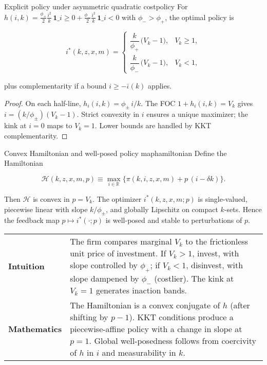 \documentclass[11pt,letterpaper,oneside]{article}
\numberwithin{equation}{section}
\newcommand{\R}{\mathbb{R}}
\newcommand{\1}{\mathbf{1}}
\newcommand{\ind}[1]{\mathbf{1}\_{{#1}}}
\newcommand{\kbar}{\bar\iota}
\begin{document}
\begin{proposition}{Explicit policy under asymmetric quadratic cost}{policy}
For
$h(i,k)=\tfrac{\phi_+}{2}\tfrac{i^2}{k}\,\ind{i\ge 0}
+\tfrac{\phi_-}{2}\tfrac{i^2}{k}\,\ind{i<0}$
with $\phi_->\phi_+$, the optimal policy is

$$
i^*(k,z,x,m)=
\begin{cases}
\dfrac{k}{\phi_+}\,\big(V_k-1\big), & V_k\ge 1,\\[6pt]
\dfrac{k}{\phi_-}\,\big(V_k-1\big), & V_k< 1,
\end{cases}
$$

plus complementarity if a bound $i\ge -\kbar(k)$ applies.
\end{proposition}

\begin{proof}
On each half-line, $h_i(i,k)=\phi_\pm\,i/k$. The FOC $1+h_i(i,k)=V_k$ gives $i=(k/\phi_\pm)(V_k-1)$. Strict convexity in $i$ ensures a unique maximizer; the kink at $i=0$ maps to $V_k=1$. Lower bounds are handled by KKT complementarity.
\end{proof}

\begin{proposition}{Convex Hamiltonian and well-posed policy map}{hamiltonian}
Define the Hamiltonian

$$
\mathcal{H}(k,z,x,m,p)\equiv \max_{i\in\R}\{\pi(k,i,z,x,m)+p\,(i-\delta k)\}.
$$

Then $\mathcal{H}$ is convex in $p=V_k$. The optimizer $i^*(k,z,x,m;p)$ is single-valued, piecewise linear with slope $k/\phi_\pm$, and globally Lipschitz on compact $k$-sets. Hence the feedback map $p\mapsto i^*(\cdot;p)$ is well-posed and stable to perturbations of $p$.
\end{proposition}

\begin{tcolorbox}[didacticstyle]
\sloppy
\begin{tabularx}{\textwidth}{@{}p{}X@{}}
\textbf{Intuition} & The firm compares marginal $V_k$ to the frictionless unit price of investment. If $V_k>1$, invest, with slope controlled by $\phi_+$; if $V_k<1$, disinvest, with slope dampened by $\phi_-$ (costlier). The kink at $V_k=1$ generates inaction bands.\\
\textbf{Mathematics} & The Hamiltonian is a convex conjugate of $h$ (after shifting by $p-1$). KKT conditions produce a piecewise-affine policy with a change in slope at $p=1$. Global well-posedness follows from coercivity of $h$ in $i$ and measurability in $k$.
\end{tabularx}
\end{tcolorbox}
\end{document}
